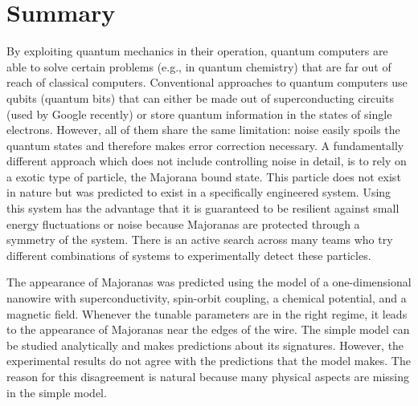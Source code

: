 \chapter*{Summary}

By exploiting quantum mechanics in their operation, quantum computers are able to solve certain problems (e.g., in quantum chemistry) that are far out of reach of classical computers.
Conventional approaches to quantum computers use qubits (quantum bits) that can either be made out of superconducting circuits (used by Google recently) or store quantum information in the states of single electrons.
However, all of them share the same limitation: noise easily spoils the quantum states and therefore makes error correction necessary.
A fundamentally different approach which does not include controlling noise in detail, is to rely on a exotic type of particle, the Majorana bound state.
This particle does not exist in nature but was predicted to exist in a specifically engineered system.
Using this system has the advantage that it is guaranteed to be resilient against small energy fluctuations or noise because Majoranas are protected through a symmetry of the system.
There is an active search across many teams who try different combinations of systems to experimentally detect these particles.

The appearance of Majoranas was predicted using the model of a one-dimensional nanowire with superconductivity, spin-orbit coupling, a chemical potential, and a magnetic field.
Whenever the tunable parameters are in the right regime, it leads to the appearance of Majoranas near the edges of the wire.
The simple model can be studied analytically and makes predictions about its signatures.
However, the experimental results do not agree with the predictions that the model makes.
The reason for this disagreement is natural because many physical aspects are missing in the simple model.

